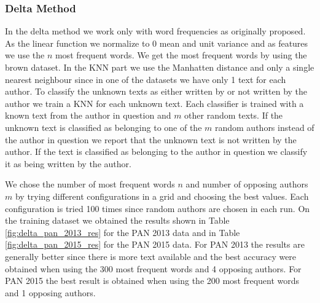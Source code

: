 \subsubsection{Delta Method} \label{subsubsec:method:delta_method}
In the delta method we work only with word frequencies as originally proposed.
As the linear function we normalize to 0 mean and unit variance and as features
we use the $n$ most frequent words. We get the most frequent words by using the
brown dataset. In the \gls{KNN} part we use the Manhatten distance and only a
single nearest neighbour since in one of the datasets we have only 1 text for
each author. To classify the unknown texts as either written by or not written
by the author we train a \gls{KNN} for each unknown text. Each classifier is
trained with a known text from the author in question and $m$ other random
texts. If the unknown text is classified as belonging to one of the $m$ random
authors instead of the author in question we report that the unknown text is not
written by the author. If the text is classified as belonging to the author in
question we classify it as being written by the author.

We chose the number of most frequent words $n$ and number of opposing
authors $m$ by trying different configurations in a grid and choosing the
best values. Each configuration is tried 100 times since random authors are
chosen in each run. On the training dataset we obtained the results shown in
Table \ref{fig:delta_pan_2013_res} for the PAN 2013 data and in Table
\ref{fig:delta_pan_2015_res} for the PAN 2015 data. For PAN 2013 the results are
generally better since there is more text available and the best accuracy were
obtained when using the 300 most frequent words and 4 opposing authors. For PAN
2015 the best result is obtained when using the 200 most frequent words and 1
opposing authors.

